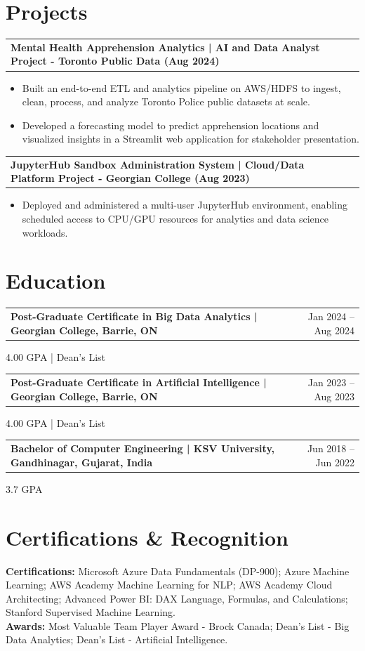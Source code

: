 \documentclass[10.5pt,letterpaper]{article}
\makeatletter
\newcommand{\resumeRow}[2]{%
  \noindent\begin{tabularx}{\linewidth}{@{}X r@{}}
    \textbf{#1} & #2 \\
  \end{tabularx}%
}
\makeatother
\begin{document}
\section{Projects}
\resumeRow{Mental Health Apprehension Analytics | AI and Data Analyst Project - Toronto Public Data (Aug 2024)}{}
\begin{itemize}
  \item Built an end-to-end ETL and analytics pipeline on AWS/HDFS to ingest, clean, process, and analyze Toronto Police public datasets at scale.
  \item Developed a forecasting model to predict apprehension locations and visualized insights in a Streamlit web application for stakeholder presentation.
\end{itemize}
\resumeRow{JupyterHub Sandbox Administration System | Cloud/Data Platform Project - Georgian College (Aug 2023)}{}
\begin{itemize}
  \item Deployed and administered a multi-user JupyterHub environment, enabling scheduled access to CPU/GPU resources for analytics and data science workloads.
\end{itemize}

\section{Education}
\resumeRow{Post-Graduate Certificate in Big Data Analytics | Georgian College, Barrie, ON}{Jan 2024 -- Aug 2024}
{\small 4.00 GPA | Dean's List}\\[0.2em]
\resumeRow{Post-Graduate Certificate in Artificial Intelligence | Georgian College, Barrie, ON}{Jan 2023 -- Aug 2023}
{\small 4.00 GPA | Dean's List}\\[0.2em]
\resumeRow{Bachelor of Computer Engineering | KSV University, Gandhinagar, Gujarat, India}{Jun 2018 -- Jun 2022}
{\small 3.7 GPA}\\[0.2em]

\section{Certifications \& Recognition}
\noindent\textbf{Certifications:} Microsoft Azure Data Fundamentals (DP-900); Azure Machine Learning; AWS Academy Machine Learning for NLP; AWS Academy Cloud Architecting; Advanced Power BI: DAX Language, Formulas, and Calculations; Stanford Supervised Machine Learning.\\
\noindent\textbf{Awards:} Most Valuable Team Player Award - Brock Canada; Dean's List - Big Data Analytics; Dean's List - Artificial Intelligence.
\end{document}
